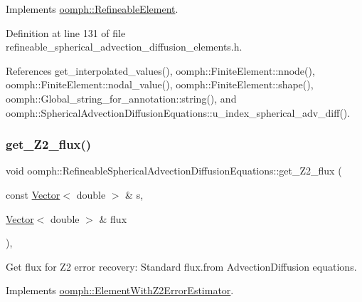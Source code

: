 Implements \hyperlink{classoomph_1_1RefineableElement_ada6f0efe831ffefb1d2829ce01d45bfc}{oomph\+::\+Refineable\+Element}.



Definition at line 131 of file refineable\+\_\+spherical\+\_\+advection\+\_\+diffusion\+\_\+elements.\+h.



References get\+\_\+interpolated\+\_\+values(), oomph\+::\+Finite\+Element\+::nnode(), oomph\+::\+Finite\+Element\+::nodal\+\_\+value(), oomph\+::\+Finite\+Element\+::shape(), oomph\+::\+Global\+\_\+string\+\_\+for\+\_\+annotation\+::string(), and oomph\+::\+Spherical\+Advection\+Diffusion\+Equations\+::u\+\_\+index\+\_\+spherical\+\_\+adv\+\_\+diff().

\mbox{\label{classoomph_1_1RefineableSphericalAdvectionDiffusionEquations_ac43262d025548fc9063c58529bd1e33f}} 
\subsubsection{\texorpdfstring{get\+\_\+\+Z2\+\_\+flux()}{get\_Z2\_flux()}}
{\footnotesize\ttfamily void oomph\+::\+Refineable\+Spherical\+Advection\+Diffusion\+Equations\+::get\+\_\+\+Z2\+\_\+flux (\begin{DoxyParamCaption}\item[{const \hyperlink{classoomph_1_1Vector}{Vector}$<$ double $>$ \&}]{s,  }\item[{\hyperlink{classoomph_1_1Vector}{Vector}$<$ double $>$ \&}]{flux }\end{DoxyParamCaption})\hspace{0.3cm}{\ttfamily [inline]}, {\ttfamily [virtual]}}



Get \textquotesingle{}flux\textquotesingle{} for Z2 error recovery\+: Standard flux.\+from Advection\+Diffusion equations. 



Implements \hyperlink{classoomph_1_1ElementWithZ2ErrorEstimator_a5688ff5f546d81771cabad82ca5a7556}{oomph\+::\+Element\+With\+Z2\+Error\+Estimator}.



